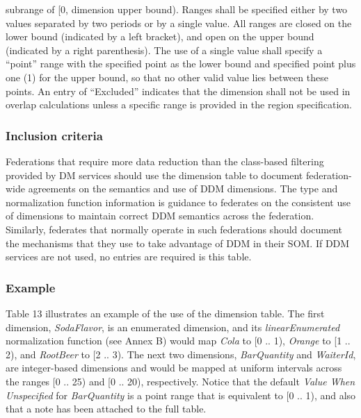 \newpage
subrange of [0, dimension upper bound). Ranges shall be specified either by two values separated by two periods or by a single value. All ranges are closed on the lower bound (indicated by a left bracket), and open on the upper bound (indicated by a right parenthesis). The use of a single value shall specify a ``point'' range with the specified point as the lower bound and specified point plus one (1) for the upper bound, so that no other valid value lies between these points. An entry of ``Excluded'' indicates that the dimension shall not be used in overlap calculations unless a specific range is provided in the region specification.

\subsubsection{Inclusion criteria}
Federations that require more data reduction than the class-based filtering provided by DM services should use the dimension table to document federation-wide agreements on the semantics and use of DDM dimensions. The type and normalization function information is guidance to federates on the consistent use of dimensions to maintain correct DDM semantics across the federation. Similarly, federates that normally operate in such federations should document the mechanisms that they use to take advantage of DDM in their SOM. If DDM services are not used, no entries are required is this table.

\subsubsection{Example}
Table 13 illustrates an example of the use of the dimension table. The first dimension, \textit{SodaFlavor}, is an enumerated dimension, and its \textit{linearEnumerated} normalization function (see Annex B) would map \textit{Cola} to [0 .. 1), \textit{Orange} to [1 .. 2), and \textit{RootBeer} to [2 .. 3). The next two dimensions, \textit{BarQuantity} and \textit{WaiterId}, are integer-based dimensions and would be mapped at uniform intervals across the ranges [0 .. 25) and [0 .. 20), respectively. Notice that the default \textit{Value When Unspecified} for \textit{BarQuantity} is a point range that is equivalent to [0 .. 1), and also that a note has been attached to the full table.

